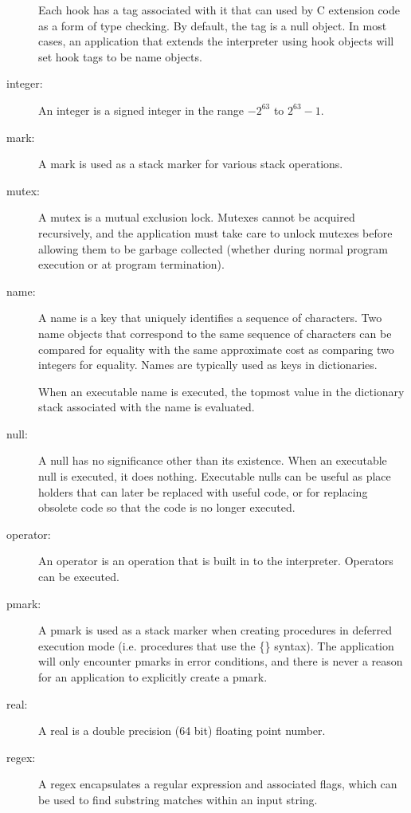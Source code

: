 \begin{description}
Each hook has a tag associated with it that can used by C extension code as a
form of type checking.  By default, the tag is a null object.  In most cases, an
application that extends the interpreter using hook objects will set hook tags
to be name objects.

\item[integer: ] An integer is a signed integer in the range $-2^{63}$ to
$2^{63} - 1$.

\item[mark: ] A mark is used as a stack marker for various stack operations.

\item[mutex: ] A mutex is a mutual exclusion lock.  Mutexes cannot be acquired
recursively, and the application must take care to unlock mutexes before
allowing them to be garbage collected (whether during normal program execution
or at program termination).

\item[name: ] A name is a key that uniquely identifies a sequence of characters.
Two name objects that correspond to the same sequence of characters can be
compared for equality with the same approximate cost as comparing two integers
for equality.  Names are typically used as keys in dictionaries.

When an executable name is executed, the topmost value in the dictionary stack
associated with the name is evaluated.

\item[null: ] A null has no significance other than its existence.  When an
executable null is executed, it does nothing.  Executable nulls can be useful as
place holders that can later be replaced with useful code, or for replacing
obsolete code so that the code is no longer executed.

\item[operator: ] An operator is an operation that is built in to the
interpreter.  Operators can be executed.

\item[pmark: ] A pmark is used as a stack marker when creating procedures in
deferred execution mode (i.e. procedures that use the \{\} syntax).  The
application will only encounter pmarks in error conditions, and there is never a
reason for an application to explicitly create a pmark.

\item[real: ] A real is a double precision (64 bit) floating point number.

\item[regex: ] A regex encapsulates a regular expression and associated flags,
which can be used to find substring matches within an input string.


\end{description}
